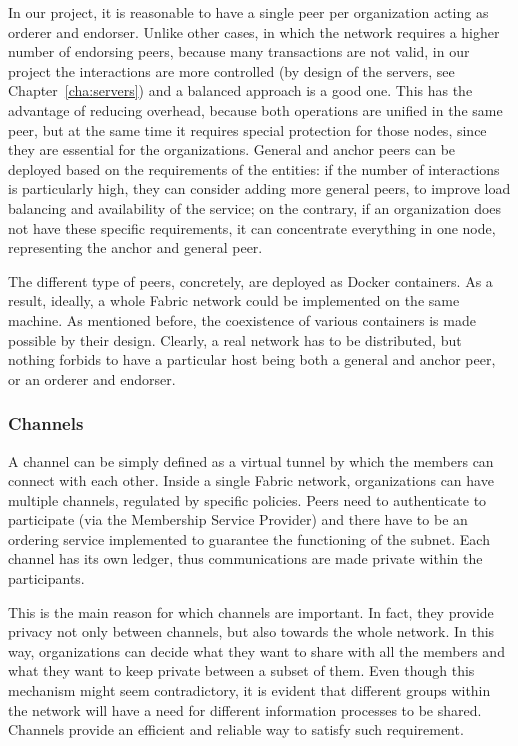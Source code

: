 In our project, it is reasonable to have a single peer per organization acting as orderer and endorser. Unlike other cases, in which the network requires a higher number of endorsing peers, because many transactions are not valid, in our project the interactions are more controlled (by design of the servers, see Chapter~\ref{cha:servers}) and a balanced approach is a good one. This has the advantage of reducing overhead, because both operations are unified in the same peer, but at the same time it requires special protection for those nodes, since they are essential for the organizations. General and anchor peers can be deployed based on the requirements of the entities: if the number of interactions is particularly high, they can consider adding more general peers, to improve load balancing and availability of the service; on the contrary, if an organization does not have these specific requirements, it can concentrate everything in one node, representing the anchor and general peer.

The different type of peers, concretely, are deployed as Docker containers. As a result, ideally, a whole Fabric network could be implemented on the same machine. As mentioned before, the coexistence of various containers is made possible by their design. Clearly, a real network has to be distributed, but nothing forbids to have a particular host being both a general and anchor peer, or an orderer and endorser.

\subsubsection{Channels}
A channel can be simply defined as a virtual tunnel by which the members can connect with each other. Inside a single Fabric network, organizations can have multiple channels, regulated by specific policies. Peers need to authenticate to participate (via the Membership Service Provider) and there have to be an ordering service implemented to guarantee the functioning of the subnet. Each channel has its own ledger, thus communications are made private within the participants.

This is the main reason for which channels are important. In fact, they provide privacy not only between channels, but also towards the whole network. In this way, organizations can decide what they want to share with all the members and what they want to keep private between a subset of them.
Even though this mechanism might seem contradictory, it is evident that different groups within the network will have a need for different information processes to be shared. Channels provide an efficient and reliable way to satisfy such requirement.

